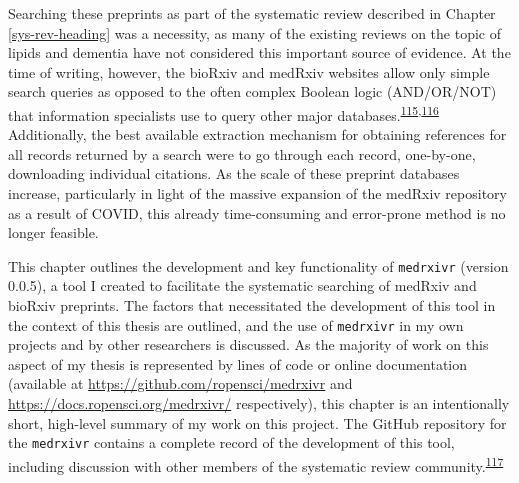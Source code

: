 \documentclass[a4paper, twoside]{templates/ociamthesis}
\begin{document}
Searching these preprints as part of the systematic review described in Chapter \ref{sys-rev-heading} was a necessity, as many of the existing reviews on the topic of lipids and dementia have not considered this important source of evidence. At the time of writing, however, the bioRxiv and medRxiv websites allow only simple search queries as opposed to the often complex Boolean logic (AND/OR/NOT) that information specialists use to query other major databases.\textsuperscript{\protect\hyperlink{ref-bramer2018}{115},\protect\hyperlink{ref-gusenbauer2020}{116}} Additionally, the best available extraction mechanism for obtaining references for all records returned by a search were to go through each record, one-by-one, downloading individual citations. As the scale of these preprint databases increase, particularly in light of the massive expansion of the medRxiv repository as a result of COVID, this already time-consuming and error-prone method is no longer feasible.

This chapter outlines the development and key functionality of \texttt{medrxivr} (version 0.0.5), a tool I created to facilitate the systematic searching of medRxiv and bioRxiv preprints. The factors that necessitated the development of this tool in the context of this thesis are outlined, and the use of \texttt{medrxivr} in my own projects and by other researchers is discussed. As the majority of work on this aspect of my thesis is represented by lines of code or online documentation (available at \url{https://github.com/ropensci/medrxivr} and \url{https://docs.ropensci.org/medrxivr/} respectively), this chapter is an intentionally short, high-level summary of my work on this project. The GitHub repository for the \texttt{medrxivr} contains a complete record of the development of this tool, including discussion with other members of the systematic review community.\textsuperscript{\protect\hyperlink{ref-zotero-15029}{117}}

~
\end{document}
